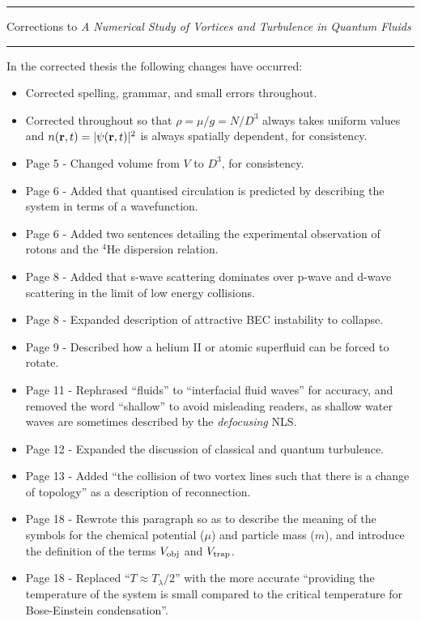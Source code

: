 \documentclass{article}
\begin{document}
\hrule
\vspace{4pt}
Corrections to {\it A Numerical Study of Vortices and Turbulence in Quantum Fluids}\\
\vspace{-1pt}
\hrule

In the corrected thesis the following changes have occurred:

\begin{itemize}
\item Corrected spelling, grammar, and small errors throughout.
\item Corrected throughout so that $\rho = \mu/g = N/D^3$ always takes uniform values and $n({\bf r},t) = |\psi({\bf r},t)|^2$ is always spatially dependent, for consistency.
\item Page 5 -  Changed volume from $V$ to $D^3$, for consistency.
\item Page 6 -  Added that quantised circulation is predicted by describing the system in terms of a wavefunction.
\item Page 6 -  Added two sentences detailing the experimental observation of rotons and the $^4$He dispersion relation.
\item Page 8 -  Added that s-wave scattering dominates over p-wave and d-wave scattering in the limit of low energy collisions.
\item Page 8 -  Expanded description of attractive BEC instability to collapse.
\item Page 9 -  Described how a helium II or atomic superfluid can be forced to rotate.
\item Page 11 - Rephrased ``fluids'' to ``interfacial fluid waves'' for accuracy, and removed the word ``shallow'' to avoid misleading readers, as shallow water waves are sometimes described by the {\it defocusing} NLS. 
\item Page 12 - Expanded the discussion of classical and quantum turbulence.
\item Page 13 - Added ``the collision of two vortex lines such that there is a change of topology'' as a description of reconnection.
\item Page 18 - Rewrote this paragraph so as to describe the meaning of the symbols for the chemical potential ($\mu$) and particle mass ($m$), and introduce the definition of the terms $V_{\rm obj}$ and $V_{\rm trap}$.
\item Page 18 - Replaced ``$T\approx T_\lambda/2$'' with the more accurate ``providing the temperature of the system is small compared to the critical temperature for Bose-Einstein condensation''.

\end{itemize}
\end{document}
